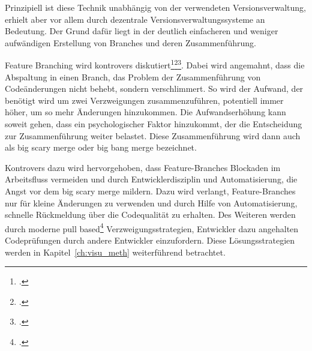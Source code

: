 Prinzipiell ist diese Technik unabhängig von der verwendeten Versionsverwaltung, erhielt aber vor allem durch dezentrale 
Versionsverwaltungssysteme an Bedeutung. Der Grund dafür liegt in der deutlich einfacheren und weniger aufwändigen 
Erstellung von Branches und deren Zusammenführung.

Feature Branching wird kontrovers diskutiert\footcite[vgl.][]{fowler-feature-branch}\footcite[vgl.][]{ci-is-dead}\footcite[vgl.][]{fb-revisited}. 
Dabei wird angemahnt, dass die Abspaltung in einen Branch, das Problem der Zusammenführung von Codeänderungen nicht 
behebt, sondern verschlimmert. So wird der Aufwand, der benötigt wird um zwei Verzweigungen zusammenzuführen, potentiell 
immer höher, um so mehr Änderungen hinzukommen. Die Aufwandserhöhung kann soweit gehen, dass ein psychologischer Faktor 
hinzukommt, der die Entscheidung zur Zusammenführung weiter belastet. Diese Zusammenführung wird dann auch als \glqq big
scary merge\grqq{} oder \glqq big bang merge\grqq{} bezeichnet.

Kontrovers dazu wird hervorgehoben, dass Feature-Branches Blockaden im Arbeitsfluss vermeiden und durch Entwicklerdisziplin und Automatisierung, die Angst vor dem \glqq big scary merge\grqq{} mildern. Dazu wird verlangt, Feature-Branches nur für kleine Änderungen zu verwenden und durch Hilfe von Automatisierung, schnelle Rückmeldung über die Codequalität zu erhalten. Des Weiteren werden durch moderne \glqq pull based\grqq{}\footcite[vgl.][]{github-about-pull} Verzweigungsstrategien, Entwickler dazu angehalten Codeprüfungen durch andere Entwickler einzufordern. Diese
Lösungsstrategien werden in Kapitel~\ref{ch:visu_meth} weiterführend betrachtet.